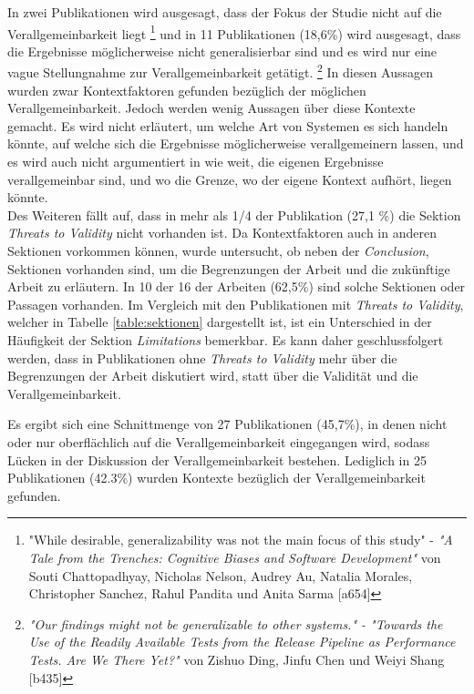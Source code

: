 In zwei Publikationen wird ausgesagt, dass der Fokus der Studie nicht auf die Verallgemeinbarkeit liegt
\footnote{ "While desirable, generalizability was not the main focus of this study" - \textit{"A Tale from the Trenches: Cognitive Biases and Software Development"} von Souti Chattopadhyay, Nicholas Nelson, Audrey Au, Natalia Morales, Christopher Sanchez, Rahul Pandita und Anita Sarma [a654]}
und in 11 Publikationen (18,6\%) wird ausgesagt, dass die Ergebnisse möglicherweise nicht generalisierbar sind und es wird nur eine vague Stellungnahme zur Verallgemeinbarkeit getätigt.
\footnote{ \textit{"Our findings might not be generalizable to other systems." - "Towards the Use of the Readily Available Tests from the Release
Pipeline as Performance Tests. Are We There Yet?"} von Zishuo Ding, Jinfu Chen und Weiyi Shang [b435] }
In diesen Aussagen wurden zwar Kontextfaktoren gefunden bezüglich der möglichen Verallgemeinbarkeit.
Jedoch werden wenig Aussagen über diese Kontexte gemacht.
Es wird nicht erläutert, um welche Art von Systemen es sich handeln könnte, auf welche sich die Ergebnisse möglicherweise verallgemeinern lassen,
und es wird auch nicht argumentiert in wie weit, die eigenen Ergebnisse verallgemeinbar sind, und wo die Grenze, wo der eigene Kontext aufhört, liegen könnte. \\


Des Weiteren fällt auf, dass in mehr als 1/4 der Publikation (27,1 \%) die Sektion \textit{Threats to Validity} nicht vorhanden ist. Da Kontextfaktoren auch in anderen Sektionen vorkommen können, wurde untersucht, ob neben der \textit{Conclusion}, Sektionen vorhanden sind, um die Begrenzungen der Arbeit und die zukünftige Arbeit zu erläutern.
In 10 der 16 der Arbeiten (62,5\%) sind solche Sektionen oder Passagen vorhanden. Im Vergleich mit den Publikationen mit \textit{Threats to Validity}, welcher in Tabelle \ref{table:sektionen} dargestellt ist, ist ein Unterschied in der Häufigkeit der Sektion \textit{Limitations} bemerkbar.
Es kann daher geschlussfolgert werden, dass in Publikationen ohne \textit{Threats to Validity} mehr über die Begrenzungen der Arbeit diskutiert wird, statt über die Validität und die Verallgemeinbarkeit.



Es ergibt sich eine Schnittmenge von 27 Publikationen (45,7\%), in denen nicht oder nur oberflächlich auf die Verallgemeinbarkeit eingegangen wird,
sodass Lücken in der Diskussion der Verallgemeinbarkeit bestehen.
Lediglich in 25 Publikationen (42.3\%) wurden Kontexte bezüglich der Verallgemeinbarkeit gefunden. \\


